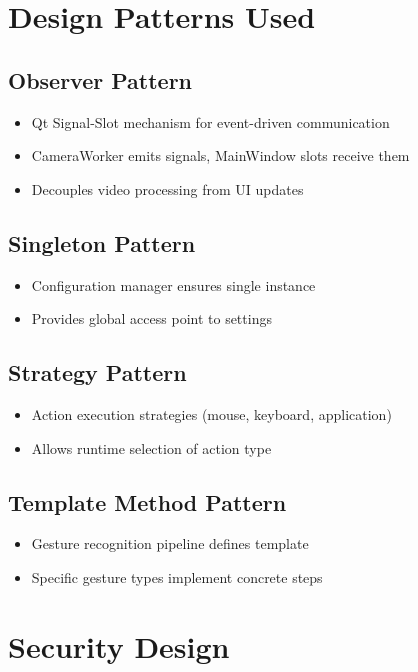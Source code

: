 \documentclass[12pt,a4paper]{report}
\begin{document}
\section{Design Patterns Used}

\subsection{Observer Pattern}
\begin{itemize}
    \item Qt Signal-Slot mechanism for event-driven communication
    \item CameraWorker emits signals, MainWindow slots receive them
    \item Decouples video processing from UI updates
\end{itemize}

\subsection{Singleton Pattern}
\begin{itemize}
    \item Configuration manager ensures single instance
    \item Provides global access point to settings
\end{itemize}

\subsection{Strategy Pattern}
\begin{itemize}
    \item Action execution strategies (mouse, keyboard, application)
    \item Allows runtime selection of action type
\end{itemize}

\subsection{Template Method Pattern}
\begin{itemize}
    \item Gesture recognition pipeline defines template
    \item Specific gesture types implement concrete steps
\end{itemize}

\section{Security Design}
\end{document}
